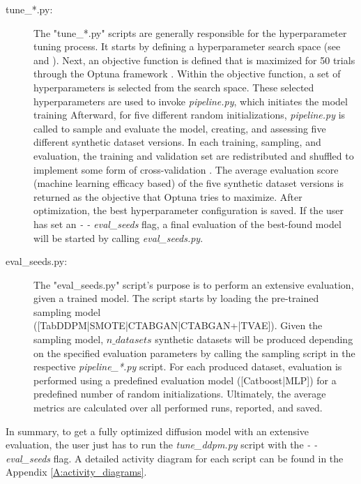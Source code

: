 \begin{description}
	\item[tune\_*.py\footnotemark:]
		The "tune\_*.py" scripts are generally responsible for the hyperparameter tuning process.
		It starts by defining a hyperparameter search space (see \cite[Table 1, p. 4]{kotelnikov2022TabDDPMModellingTabular} and \cite[Table 7-11, p. 13 f.]{kotelnikov2022TabDDPMModellingTabular}).
		Next, an objective function is defined that is maximized for 50 trials through the Optuna framework \cite{optuna_2019}.
		Within the objective function, a set of hyperparameters is selected from the search space.
		These selected hyperparameters are used to invoke \textit{pipeline.py}, which initiates the model training
		Afterward, for five different random initializations, \textit{pipeline.py} is called to sample and evaluate the model, creating, and assessing five different synthetic dataset versions.
		In each training, sampling, and evaluation, the training and validation set are redistributed and shuffled to implement some form of cross-validation \cite{kohavi1995StudyCrossvalidationBootstrap}.
		The average evaluation score (machine learning efficacy based) of the five synthetic dataset versions is returned as the objective that Optuna tries to maximize.
		After optimization, the best hyperparameter configuration is saved.
		If the user has set an \textit{- - eval\_seeds} flag, a final evaluation of the best-found model will be started by calling \textit{eval\_seeds.py}.
		
	\item[eval\_seeds.py:]
		The "eval\_seeds.py" script's purpose is to perform an extensive evaluation, given a trained model.
		The script starts by loading the pre-trained sampling model \\([TabDDPM|SMOTE|CTABGAN|CTABGAN+|TVAE]).
		Given the sampling model, $n\_datasets$ synthetic datasets will be produced depending on the specified evaluation parameters by calling the sampling script in the respective \textit{pipeline\_*.py} script.
		For each produced dataset, evaluation is performed using a predefined evaluation model ([Catboost|MLP]) for a predefined number of random initializations.
		Ultimately, the average metrics are calculated over all performed runs, reported, and saved.
\end{description}

In summary, to get a fully optimized diffusion model with an extensive evaluation, the user just has to run the \textit{tune\_ddpm.py} script with the \textit{- - eval\_seeds} flag.
A detailed activity diagram for each script can be found in the Appendix \ref{A:activity_diagrams}.

